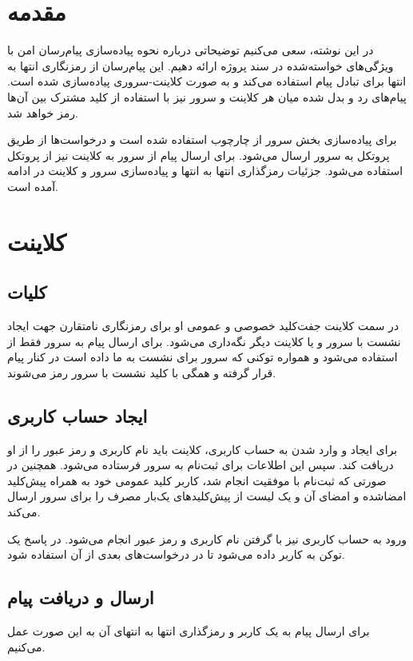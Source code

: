\documentclass{article}
\begin{document}
\section{مقدمه}
در این نوشته، سعی می‌کنیم توضیحاتی درباره نحوه پیاده‌سازی پیام‌رسان امن با ویژگی‌های خواسته‌شده در سند پروژه ارائه دهیم.
این پیام‌رسان از رمزنگاری انتها به انتها برای تبادل پیام استفاده می‌کند و به صورت کلاینت‌-سروری پیاده‌سازی شده است.
پیام‌های رد و بدل شده میان هر کلاینت و سرور نیز با استفاده از کلید مشترک بین آن‌ها رمز خواهد شد.

برای پیاده‌سازی بخش سرور از چارچوب  استفاده شده است و درخواست‌‌ها از طریق پروتکل  به سرور ارسال می‌شود.
برای ارسال پیام از سرور به کلاینت نیز از پروتکل  استفاده می‌شود.
جزئیات رمزگذاری انتها به انتها و پیاده‌سازی سرور و کلاینت در ادامه آمده است.

\section{کلاینت}
\subsection{کلیات}
در سمت کلاینت جفت‌کلید خصوصی و عمومی او برای رمزنگاری نامتقارن جهت ایجاد نشست با سرور و یا کلاینت دیگر نگه‌داری می‌شود.
برای ارسال پیام به سرور فقط از  استفاده می‌شود و همواره توکنی که سرور برای نشست به ما داده است در کنار پیام قرار گرفته و همگی با کلید نشست با سرور رمز می‌شوند.

\subsection{ایجاد حساب کاربری}
برای ایجاد و وارد شدن به حساب کاربری، کلاینت باید نام کاربری و رمز عبور را از او دریافت کند.
سپس این اطلاعات برای ثبت‌نام به سرور فرستاده می‌شود.
همچنین در صورتی که ثبت‌نام با موفقیت انجام شد، کاربر کلید عمومی خود به همراه پیش‌کلید امضاشده و امضای آن و یک لیست از پیش‌کلیدهای یک‌بار مصرف را برای سرور ارسال می‌کند.

ورود به حساب کاربری نیز با گرفتن نام کاربری و رمز عبور انجام می‌شود.
در پاسخ یک توکن به کاربر داده می‌شود تا در درخواست‌های بعدی از آن استفاده شود.

\subsection{ارسال و دریافت پیام}
برای ارسال پیام به یک کاربر و رمزگذاری انتها به انتهای آن به این صورت عمل می‌کنیم.
\end{document}
